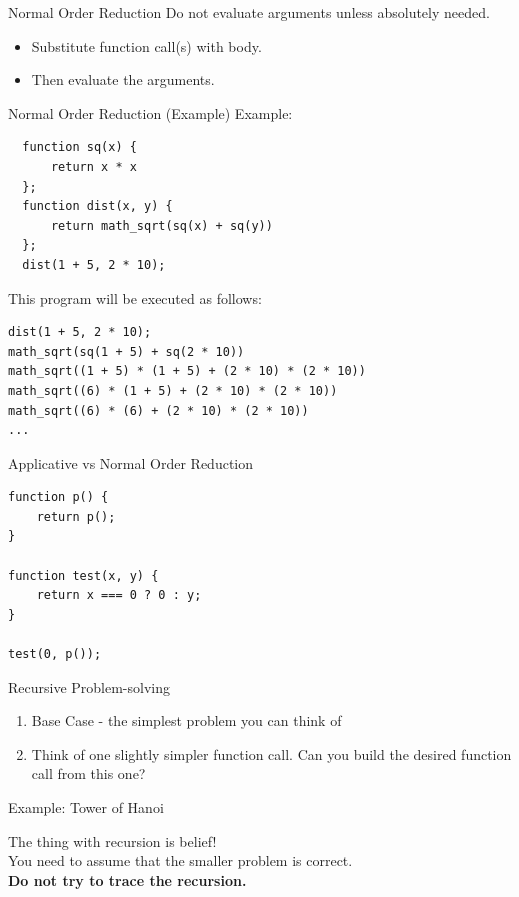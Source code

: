 \documentclass[10pt]{beamer}
\begin{document}
\begin{frame}[fragile]{Normal Order Reduction}
  Do not evaluate arguments unless absolutely needed.
  \begin{itemize}
    \item Substitute function call(s) with body.
    \item Then evaluate the arguments.
  \end{itemize}
\end{frame}

\begin{frame}[fragile]{Normal Order Reduction (Example)}
Example:
  \begin{verbatim}
  function sq(x) { 
      return x * x 
  };
  function dist(x, y) { 
      return math_sqrt(sq(x) + sq(y)) 
  };
  dist(1 + 5, 2 * 10);
  \end{verbatim}

  This program will be executed as follows:
  \begin{verbatim}
dist(1 + 5, 2 * 10);
math_sqrt(sq(1 + 5) + sq(2 * 10))
math_sqrt((1 + 5) * (1 + 5) + (2 * 10) * (2 * 10))
math_sqrt((6) * (1 + 5) + (2 * 10) * (2 * 10))
math_sqrt((6) * (6) + (2 * 10) * (2 * 10))
...
  \end{verbatim}
\end{frame}

\begin{frame}[fragile]{Applicative vs Normal Order Reduction}
\begin{verbatim}
function p() {
    return p();
}

function test(x, y) {
    return x === 0 ? 0 : y;
}

test(0, p());
\end{verbatim}
\end{frame}

\begin{frame}[fragile]{Recursive Problem-solving}
  \begin{enumerate}
    \item Base Case - the simplest problem you can think of
    \item Think of one slightly simpler function call. Can you build the desired function call from this one?
  \end{enumerate}
  Example: Tower of Hanoi

  The thing with recursion is belief! \\
  You need to assume that the smaller problem is correct. \\
  \textbf{Do not try to trace the recursion.}
\end{frame}
\end{document}
